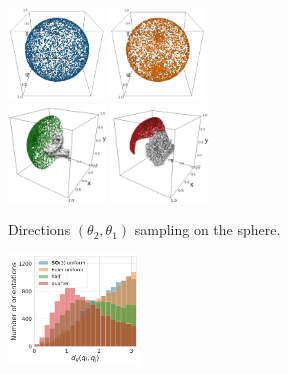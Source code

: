 \begin{figure}[ht!]
    \centering
    \begin{minipage}{.33\linewidth}
        \begin{subfigure}[b]{0.99\linewidth}
            \centering
            \includegraphics[height=6.5em]{figures/uniform_quaternion.png}%
            \hspace{1em}%
            \includegraphics[height=6.5em]{figures/uniform_angles.png}
            \\ \vspace{2em}
            \includegraphics[height=7em]{figures/5j0n-cvg2.pdf}
            \hspace{1em}%
            \includegraphics[height=7em]{figures/5a1a-cvg2.pdf}
            \caption{Directions $(\theta_2, \theta_1)$ sampling on the sphere.}
            \label{fig:orientation-sampling}
        \end{subfigure}
    \end{minipage}
    \hfill
    \begin{minipage}{.65\linewidth}
        \begin{subfigure}[b]{0.37\linewidth}
            \centering
            \includegraphics[height=8em]{figures/dQ_distribution_coverage.pdf}

\end{subfigure}
\end{minipage}
\end{figure}
